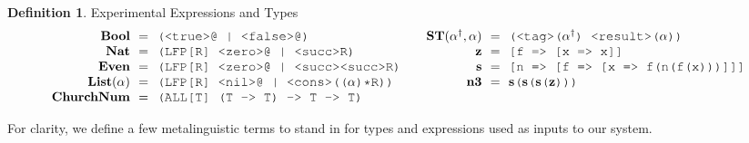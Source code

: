 \documentclass[acmsmall]{acmart}
\theoremstyle{definition}
\newtheorem{definition}{Definition}[section]
\begin{document}
\begin{definition} Experimental Expressions and Types  
  \label{def:experimental_expressions_and_types}
  \scriptsize
  \[
  \begin{array}[t]{ll}
    \begin{array}[t]{r@{}c@{}l}
      \textbf{Bool} 
      &\ \ =\ \ & 
      \J{(<true>@ | <false>@)} 
      \\
      \textbf{Nat} 
      &\ \ =\ \ & 
      \J{(LFP[R] <zero>@ | <succ>R)} 
      \\
      \textbf{Even} 
      &\ \ =\ \ & 
      \J{(LFP[R] <zero>@ | <succ><succ>R)} 
      \\
      \textbf{List}(\alpha) 
      &\ \ =\ \ & 
      \J{(LFP[R] <nil>@ | <cons>((}\alpha\J{)*R))} 
      \\
      \textbf{ChurchNum} 
      &\ \ =\ \ & 
      \J{(ALL[T] (T -> T) -> T -> T)}
    \end{array}
    &
    \begin{array}[t]{r@{}c@{}l}
      \textbf{ST}(\alpha^\dagger, \alpha) 
      &\ \ =\ \ & 
      \J{(<tag>(}\alpha^\dagger \J{) <result>(} \alpha \J{))}
      \\
      \textbf{z} 
      &\ \ =\ \ & 
      \J{[f => [x => x]]} 
      \\
      \textbf{s} 
      &\ \ =\ \ & 
      \J{[n => [f => [x => f(n(f(x)))]]]} 
      \\
      \textbf{n3} 
      &\ \ =\ \ & 
      \textbf{s}\J{(}\textbf{s}\J{(}\textbf{s}\J{(}\textbf{z}\J{)}\J{)}\J{)} 
    \end{array}
  \end{array}
  \]
\end{definition}

\noindent
For clarity, we define a few metalinguistic terms to stand in for 
types and expressions used as inputs to our system. 
\end{document}
